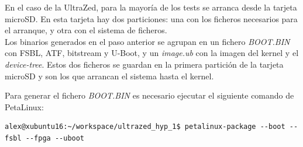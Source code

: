 En el caso de la UltraZed\texttrademark, para la mayoría de los tests se arranca desde la tarjeta microSD. En esta tarjeta hay dos particiones: una con los ficheros necesarios para el arranque, y otra con el sistema de ficheros.\\

Los binarios generados en el paso anterior se agrupan en un fichero \textit{BOOT.BIN} con \acrshort{FSBL}, \acrshort{ATF}, bitstream y U-Boot, y un \textit{image.ub} con la imagen del kernel y el \textit{device-tree}. Estos dos ficheros se guardan en la primera partición de la tarjeta microSD y son los que arrancan el sistema hasta el kernel.

Para generar el fichero \textit{BOOT.BIN} es necesario ejecutar el siguiente comando de PetaLinux:

\begin{lstlisting}[style=CStyle]
alex@xubuntu16:~/workspace/ultrazed_hyp_1$ petalinux-package --boot --fsbl --fpga --uboot
\end{lstlisting}
